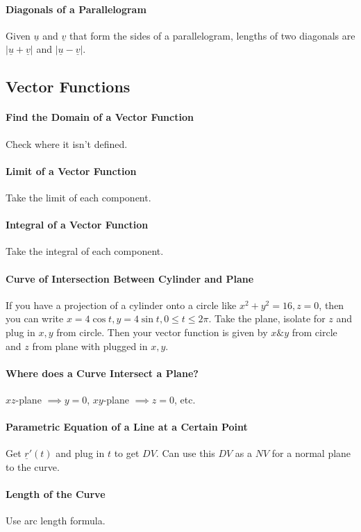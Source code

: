 \documentclass[12 pt]{article}
\theoremstyle{definition}
\begin{document}
\paragraph{Diagonals of a Parallelogram} Given $\underline{u}$ and $\underline{v}$ that form the sides of a parallelogram, lengths of two diagonals are $|\underline{u}+\underline{v}|$ and $|\underline{u}-\underline{v}|$.
\subsection{Vector Functions}
\paragraph{Find the Domain of a Vector Function} Check where it isn't defined.
\paragraph{Limit of a Vector Function} Take the limit of each component.
\paragraph{Integral of a Vector Function} Take the integral of each component.
\paragraph{Curve of Intersection Between Cylinder and Plane} If you have a projection of a cylinder onto a circle like $x^2+y^2=16,z=0$, then you can write $x=4\cos t,y=4 \sin t, 0\leq t \leq 2\pi$. Take the plane, isolate for $z$ and plug in $x,y$ from circle. Then your vector function is given by $x \& y$ from circle and $z$ from plane with plugged in $x,y$.
\paragraph{Where does a Curve Intersect a Plane?}$xz$-plane $\implies y=0$, $xy$-plane $\implies z=0$, etc.
\paragraph{Parametric Equation of a Line at a Certain Point} Get $\underline{r}'(t)$ and plug in $t$ to get $DV$. Can use this $DV$ as a $NV$ for a normal plane to the curve.
\paragraph{Length of the Curve} Use arc length formula. 
\end{document}
